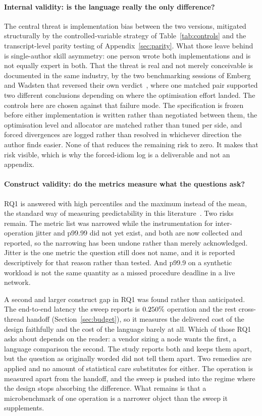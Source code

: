\documentclass[english,oneside,a4paper,censored,csm,software-track-2020]{HYthesisML}
\begin{document}
\begin{appendices}
\paragraph{Internal validity: is the language really the only difference?}
The central threat is implementation bias between the two versions, mitigated structurally by the
controlled-variable strategy of Table~\ref{tab:controls} and the transcript-level parity testing
of Appendix~\ref{sec:parity}. What those leave behind is single-author skill asymmetry: one person
wrote both implementations and is not equally expert in both. That the threat is real and not
merely conceivable is documented in the same industry, by the two benchmarking sessions of Emberg
and Wadsten that reversed their own verdict~\cite{emberg2023asn1}, where one matched pair
supported two different conclusions depending on where the optimisation effort landed. The
controls here are chosen against that failure mode. The specification is frozen before either
implementation is written rather than negotiated between them, the optimisation level and
allocator are matched rather than tuned per side, and forced divergences are logged rather than
resolved in whichever direction the author finds easier. None of that reduces the remaining risk
to zero. It makes that risk visible, which is why the forced-idiom log is a deliverable and not an
appendix.

\paragraph{Construct validity: do the metrics measure what the questions ask?}
RQ1 is answered with high percentiles and the maximum instead of the mean, the standard way of
measuring predictability in this literature~\cite{dean2013tail}. Two risks remain. The metric list
was narrowed while the instrumentation for inter-operation jitter and p99.99 did not yet exist,
and both are now collected and reported, so the narrowing has been undone rather than merely
acknowledged. Jitter is the one metric the question still does not name, and it is reported
descriptively for that reason rather than tested. And p99.9 on a synthetic workload is not the
same quantity as a missed procedure deadline in a live network.

A second and larger construct gap in RQ1 was found rather than anticipated. The end-to-end latency
the sweep reports is $0.250\%$ operation and the rest cross-thread handoff
(Section~\ref{sec:budget}), so it measures the delivered cost of the design faithfully and the
cost of the language barely at all. Which of those RQ1 asks about depends on the reader: a vendor
sizing a node wants the first, a language comparison the second. The study reports both and keeps
them apart, but the question as originally worded did not tell them apart. Two remedies are
applied and no amount of statistical care substitutes for either. The operation is measured apart
from the handoff, and the sweep is pushed into the regime where the design stops absorbing the
difference. What remains is that a microbenchmark of one operation is a narrower object than the
sweep it supplements.


\end{appendices}
\end{document}
